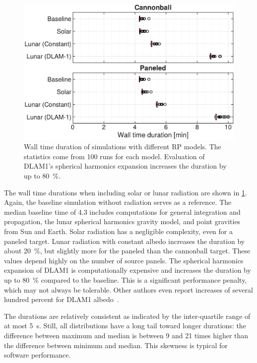 \begin{figure}[b]
    \centering
    \includegraphics[width=\linewidth]{figures/plots/performance.pdf}
    \caption{Wall time duration of simulations with different \gls{RP} models. The statistics come from 100 runs for each model. Evaluation of \gls{DLAM1}'s spherical harmonics expansion increases the duration by up to \qty{80}{\percent}.}
    \label{fig:performance}
\end{figure}

The wall time durations when including solar or lunar radiation are shown in \cref{fig:performance}. Again, the baseline simulation without radiation serves as a reference. The median baseline time of \qty{4.3}{\min} includes computations for general integration and propagation, the lunar spherical harmonics gravity model, and point gravities from Sun and Earth. Solar radiation has a negligible complexity, even for a paneled target. Lunar radiation with constant albedo increases the duration by about \qty{20}{\percent}, but slightly more for the paneled than the cannonball target. These values depend highly on the number of source panels. The spherical harmonics expansion of \gls{DLAM1} is computationally expensive and increases the duration by up to \qty{80}{\percent} compared to the baseline. This is a significant performance penalty, which may not always be tolerable. Other authors even report increases of several hundred percent for \gls{DLAM1} albedo~\cite{Nicholson2010}.

The durations are relatively consistent as indicated by the inter-quartile range of at most \qty{5}{\s}. Still, all distributions have a long tail toward longer durations: the difference between maximum and median is between 9 and 21 times higher than the difference between minimum and median. This skewness is typical for software performance.
